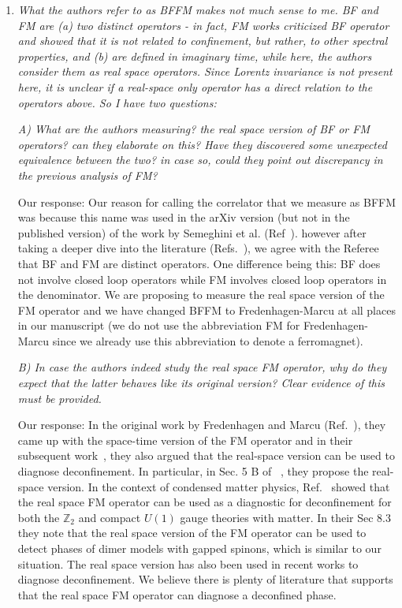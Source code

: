 \documentclass[
onecolumn,
superscriptaddress,
longbibliography,
nofootinbib,
 amsmath,amssymb,
 aps,
prb
]{revtex4-2}
\newcommand{\response}[1]{\textcolor{Mulberry}{#1}}
\begin{document}
\begin{enumerate}
\item \textit{ What the authors refer to as BFFM makes not much sense to me. BF and
FM are (a) two distinct operators - in fact, FM works criticized BF
operator and showed that it is not related to confinement, but rather,
to other spectral properties, and (b) are defined in imaginary time,
while here, the authors consider them as real space operators. Since
Lorentz invariance is not present here, it is unclear if a real-space
only operator has a direct relation to the operators above. So I have
two questions:}

\textit{A) What are the authors measuring? the real space version of BF or FM
operators? can they elaborate on this? Have they discovered some
unexpected equivalence between the two? in case so, could they point
out discrepancy in the previous analysis of FM?}

\response{Our response: Our reason for calling the correlator that we measure as BFFM was because this name was used in the arXiv version (but not in the published version) of the work by Semeghini et al. (Ref~\cite{semeghini2021probingarXiv}). %
however after taking a deeper dive into the literature (Refs.~\cite{fredenhagen1983charged, fredenhagen1986, fredenhagen1988dual, bricmont1983order}), we agree with the Referee that BF and FM are distinct operators. 
One difference being this: BF does not involve closed loop operators while FM involves closed loop operators in the denominator. 
We are proposing to measure the real space version of the FM operator and we have changed BFFM to Fredenhagen-Marcu at all places in our manuscript (we do not use the abbreviation FM for Fredenhagen-Marcu since we already use this abbreviation to denote a ferromagnet).}

\textit{B) In case the authors indeed study the real space FM operator, why do
they expect that the latter behaves like its original version? Clear
evidence of this must be provided.}

\response{Our response: In the original work by Fredenhagen and Marcu (Ref.~\cite{fredenhagen1983charged}), they came up with the space-time version of the FM operator and in their subsequent work~\cite{fredenhagen1988dual}, they also argued that the real-space version can be used to diagnose deconfinement. In particular, in Sec. 5 B of ~\cite{fredenhagen1988dual}, they propose the real-space version. 
In the context of condensed matter physics,   Ref.~\cite{gregor2011diagnosing} showed that the real space FM operator can be used as a diagnostic for deconfinement for both the $\mathbb{Z}_2$ and compact $U(1)$ gauge theories with matter. 
In their Sec 8.3 they note that the real space version of the FM operator can be used to detect phases of dimer models with gapped spinons, which is similar to our situation.
The real space version has also been used in recent works \cite{semeghini2021, verresen2021, gregor2011diagnosing, xu2024critical} to diagnose deconfinement. We believe there is plenty of literature that supports that the real space FM operator can diagnose a deconfined phase.}


\end{enumerate}
\end{document}

